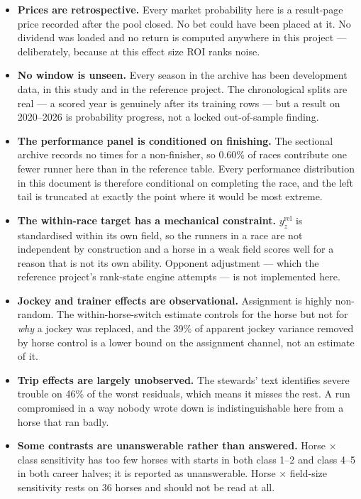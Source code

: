\documentclass[11pt,a4paper]{article}
\begin{document}
\begin{itemize}\itemsep3pt
\item \textbf{Prices are retrospective.} Every market probability here is a
result-page price recorded after the pool closed. No bet could have been placed at
it. No dividend was loaded and no return is computed anywhere in this project ---
deliberately, because at this effect size ROI ranks noise.

\item \textbf{No window is unseen.} Every season in the archive has been
development data, in this study and in the reference project. The chronological
splits are real --- a scored year is genuinely after its training rows --- but a
result on 2020--2026 is probability progress, not a locked out-of-sample finding.

\item \textbf{The performance panel is conditioned on finishing.} The sectional
archive records no times for a non-finisher, so 0.60\% of races contribute one
fewer runner here than in the reference table. Every performance distribution in
this document is therefore conditional on completing the race, and the left tail
is truncated at exactly the point where it would be most extreme.

\item \textbf{The within-race target has a mechanical constraint.} $y^{\text{rel}}_z$
is standardised within its own field, so the runners in a race are not independent
by construction and a horse in a weak field scores well for a reason that is not
its own ability. Opponent adjustment --- which the reference project's rank-state
engine attempts --- is not implemented here.

\item \textbf{Jockey and trainer effects are observational.} Assignment is highly
non-random. The within-horse-switch estimate controls for the horse but not for
\emph{why} a jockey was replaced, and the 39\% of apparent jockey variance removed
by horse control is a lower bound on the assignment channel, not an estimate of it.

\item \textbf{Trip effects are largely unobserved.} The stewards' text identifies
severe trouble on 46\% of the worst residuals, which means it misses the rest. A
run compromised in a way nobody wrote down is indistinguishable here from a horse
that ran badly.

\item \textbf{Some contrasts are unanswerable rather than answered.} Horse
$\times$ class sensitivity has too few horses with starts in both class 1--2 and
class 4--5 in both career halves; it is reported as unanswerable. Horse $\times$
field-size sensitivity rests on 36 horses and should not be read at all.


\end{itemize}
\end{document}
